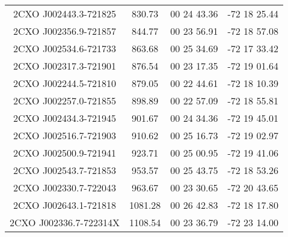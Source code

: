\begin{table}
\begin{tabular}{cccc}
2CXO J002443.3-721825 & 830.73 & 00 24 43.36 & -72 18 25.44 \\
2CXO J002356.9-721857 & 844.77 & 00 23 56.91 & -72 18 57.08 \\
2CXO J002534.6-721733 & 863.68 & 00 25 34.69 & -72 17 33.42 \\
2CXO J002317.3-721901 & 876.54 & 00 23 17.35 & -72 19 01.64 \\
2CXO J002244.5-721810 & 879.05 & 00 22 44.61 & -72 18 10.39 \\
2CXO J002257.0-721855 & 898.89 & 00 22 57.09 & -72 18 55.81 \\
2CXO J002434.3-721945 & 901.67 & 00 24 34.36 & -72 19 45.01 \\
2CXO J002516.7-721903 & 910.62 & 00 25 16.73 & -72 19 02.97 \\
2CXO J002500.9-721941 & 923.71 & 00 25 00.95 & -72 19 41.06 \\
2CXO J002543.7-721853 & 953.57 & 00 25 43.75 & -72 18 53.26 \\
2CXO J002330.7-722043 & 963.67 & 00 23 30.65 & -72 20 43.65 \\
2CXO J002643.1-721818 & 1081.28 & 00 26 42.83 & -72 18 17.80 \\
2CXO J002336.7-722314X & 1108.54 & 00 23 36.79 & -72 23 14.00 \\
\end{tabular}
\end{table}
